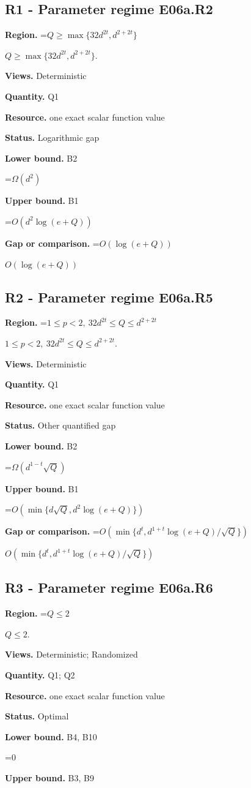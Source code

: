 \documentclass[10pt,a4paper]{article}
\newcommand{\AtlasMath}[1]{\par\begingroup\centering\setbox0=\hbox{$\displaystyle #1$}\ifdim\wd0>1.4\linewidth\typeout{ATLAS WIDE FORMULA: \the\wd0}\fi\ifdim\wd0>\linewidth\resizebox{\linewidth}{!}{\box0}\else\box0\fi\par\endgroup}
\newcommand{\AtlasInlineMath}[1]{\begingroup\setbox0=\hbox{$#1$}\ifdim\wd0>.4\linewidth\endgroup\AtlasMath{#1}\else\endgroup$#1$\fi}
\begin{document}
\subsection{R1 - Parameter regime E06a.R2}
\textbf{Region.} \AtlasInlineMath{Q\ge\max\{32d^{2t},d^{2+2t}\}}.

\textbf{Views.} Deterministic

\textbf{Quantity.} Q1

\textbf{Resource.} one exact scalar function value

\textbf{Status.} Logarithmic gap

\textbf{Lower bound.} B2

\AtlasMath{\Omega(d^2)}
\textbf{Upper bound.} B1

\AtlasMath{O(d^2\log(e+Q))}
\textbf{Gap or comparison.} \AtlasInlineMath{O(\log(e+Q))}

\subsection{R2 - Parameter regime E06a.R5}
\textbf{Region.} \AtlasInlineMath{1\le p<2,\ 32d^{2t}\le Q\le d^{2+2t}}.

\textbf{Views.} Deterministic

\textbf{Quantity.} Q1

\textbf{Resource.} one exact scalar function value

\textbf{Status.} Other quantified gap

\textbf{Lower bound.} B2

\AtlasMath{\Omega(d^{1-t}\sqrt Q)}
\textbf{Upper bound.} B1

\AtlasMath{O(\min\{d\sqrt Q,d^2\log(e+Q)\})}
\textbf{Gap or comparison.} \AtlasInlineMath{O(\min\{d^t,d^{1+t}\log(e+Q)/\sqrt Q\})}

\subsection{R3 - Parameter regime E06a.R6}
\textbf{Region.} \AtlasInlineMath{Q\le2}.

\textbf{Views.} Deterministic; Randomized

\textbf{Quantity.} Q1; Q2

\textbf{Resource.} one exact scalar function value

\textbf{Status.} Optimal

\textbf{Lower bound.} B4, B10

\AtlasMath{0}
\textbf{Upper bound.} B3, B9
\end{document}
